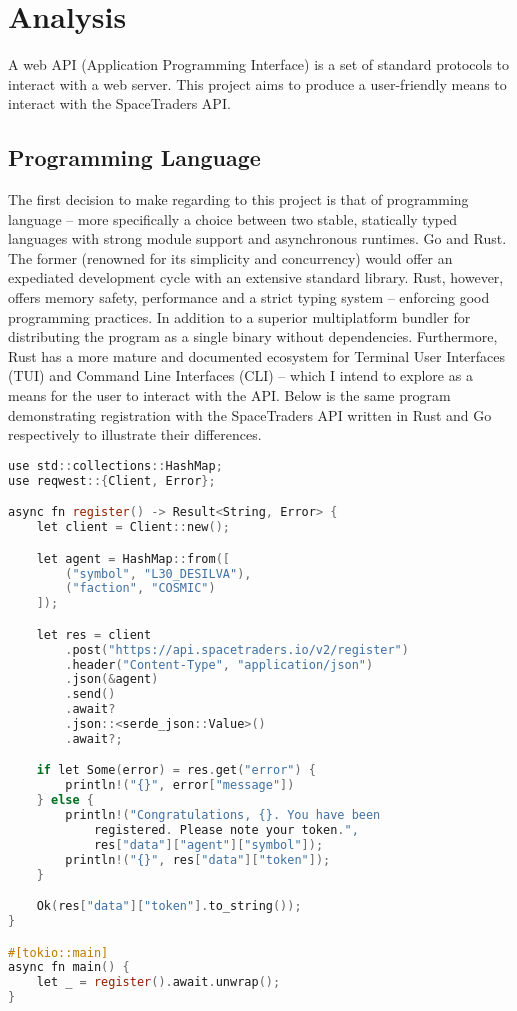 \section{Analysis}
A web API (Application Programming Interface) is a set of standard protocols to interact with a web server. This project aims to produce a user-friendly means to interact with the SpaceTraders API.

\subsection{Programming Language}
The first decision to make regarding to this project is that of programming language – more specifically a choice between two stable, statically typed languages with strong module support and asynchronous runtimes. Go and Rust. The former (renowned for its simplicity and concurrency) would offer an expediated development cycle with an extensive standard library. Rust, however, offers memory safety, performance and a strict typing system – enforcing good programming practices. In addition to a superior multiplatform bundler for distributing the program as a single binary without dependencies. Furthermore, Rust has a more mature and documented ecosystem for Terminal User Interfaces (TUI) and Command Line Interfaces (CLI) – which I intend to explore as a means for the user to interact with the API. Below is the same program demonstrating registration with the SpaceTraders API written in Rust and Go respectively to illustrate their differences. 

\begin{lstlisting}[language=C]
use std::collections::HashMap;
use reqwest::{Client, Error};

async fn register() -> Result<String, Error> {
    let client = Client::new();

    let agent = HashMap::from([
        ("symbol", "L30_DESILVA"), 
        ("faction", "COSMIC")
    ]);

    let res = client
        .post("https://api.spacetraders.io/v2/register")
        .header("Content-Type", "application/json")
        .json(&agent)
        .send()
        .await?
        .json::<serde_json::Value>()
        .await?;

    if let Some(error) = res.get("error") {
        println!("{}", error["message"])
    } else {
        println!("Congratulations, {}. You have been 
            registered. Please note your token.", 
            res["data"]["agent"]["symbol"]);
        println!("{}", res["data"]["token"]);
    }

    Ok(res["data"]["token"].to_string());
}

#[tokio::main]
async fn main() {
    let _ = register().await.unwrap();
}

\end{lstlisting}

